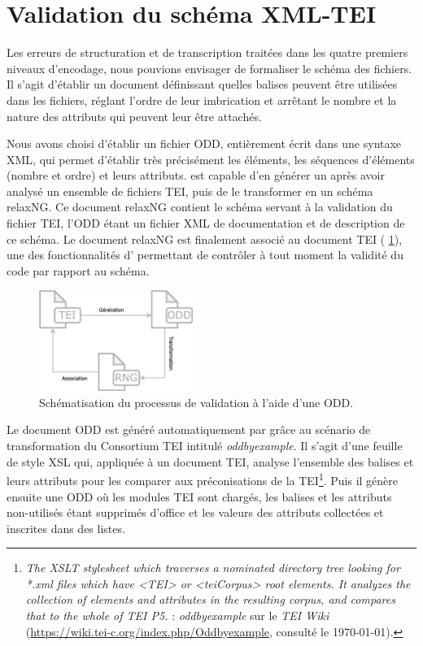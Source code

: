 \section{Validation du schéma XML-TEI}

Les erreurs de structuration et de transcription traitées dans les quatre premiers niveaux d'encodage, nous pouvions envisager de formaliser le schéma des fichiers. Il s'agit d'établir un document définissant quelles balises peuvent être utilisées dans les fichiers, réglant l'ordre de leur imbrication et arrêtant le nombre et la nature des attributs qui peuvent leur être attachés.

Nous avons choisi d'établir un fichier ODD, entièrement écrit dans une syntaxe XML, qui permet d'établir très précisément les éléments, les séquences d'éléments (nombre et ordre) et leurs attributs. \oxygen{} est capable d'en générer un après avoir analysé un ensemble de fichiers TEI, puis de le transformer en un schéma relaxNG. Ce document relaxNG contient le schéma servant à la validation du fichier TEI, l'ODD étant un fichier XML de documentation et de description de ce schéma. Le document relaxNG est finalement associé au document TEI (\fig{} \ref{fig:tei-odd-rng}), une des fonctionnalités d'\oxygen{} permettant de contrôler à tout moment la validité du code par rapport au schéma.

\begin{figure}[h]
    \centering
    \includegraphics[width=5cm]{img/tei-odd-rng.png}
    \caption{Schématisation du processus de validation à l'aide d'une ODD.}
    \label{fig:tei-odd-rng}
\end{figure}

Le document ODD est généré automatiquement par \oxygen{} grâce au scénario de transformation du Consortium TEI intitulé \textit{oddbyexample}. Il s'agit d'une feuille de style XSL qui, appliquée à un document TEI, analyse l'ensemble des balises et leurs attributs pour les comparer aux préconisations de la TEI\footnote{\textit{The XSLT stylesheet which traverses a nominated directory tree looking for *.xml files which have <TEI> or <teiCorpus> root elements. It analyzes the collection of elements and attributes in the resulting corpus, and compares that to the whole of TEI P5.} : \textit{oddbyexample} sur le \textit{TEI Wiki} (\url{https://wiki.tei-c.org/index.php/Oddbyexample}, consulté le \today).}. Puis il génère ensuite une ODD où les modules TEI sont chargés, les balises et les attributs non-utilisés étant supprimés d'office et les valeurs des attributs collectées et inscrites dans des listes.

